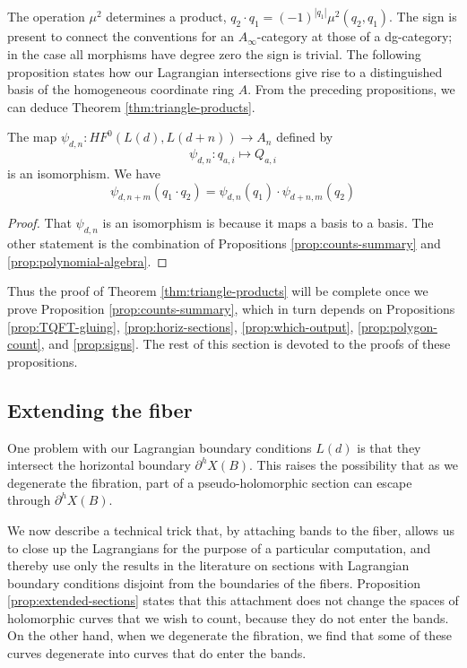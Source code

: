\documentclass[12pt]{amsart}
\begin{document}
The operation $\mu^2$ determines a product, $q_2 \cdot q_1 =
(-1)^{|q_1|} \mu^2(q_2,q_1)$. The sign is present to connect the
conventions for an $A_\infty$-category at those of a dg-category; in
the case all morphisms have degree zero the sign is trivial. The
following proposition states how our Lagrangian intersections give
rise to a distinguished basis of the homogeneous coordinate ring $A$. From the preceding propositions, we can deduce Theorem \ref{thm:triangle-products}.

\begin{proposition}
  \label{prop:coord-ring-iso}
  The map $\psi_{d,n}: HF^0(L(d),L(d+n)) \to A_n$ defined by
  \begin{equation}
    \psi_{d,n}: q_{a,i} \mapsto Q_{a,i}
  \end{equation}
  is an isomorphism. We have
  \begin{equation}
    \psi_{d,n+m} (q_1 \cdot q_2) = \psi_{d,n}(q_1) \cdot \psi_{d+n,m}(q_2)
  \end{equation}
\end{proposition}

\begin{proof}
  That $\psi_{d,n}$ is an isomorphism is because it maps a basis to a
  basis. The other statement is the combination of 
Propositions \ref{prop:counts-summary} and
  \ref{prop:polynomial-algebra}.
\end{proof}

Thus the proof of Theorem \ref{thm:triangle-products} will be complete once we prove Proposition \ref{prop:counts-summary}, which in turn depends on  Propositions \ref{prop:TQFT-gluing}, \ref{prop:horiz-sections},
  \ref{prop:which-output}, \ref{prop:polygon-count}, and \ref{prop:signs}. The rest of this section is devoted to the proofs of these propositions.

\subsection{Extending the fiber}
\label{sec:extend-fiber}

One problem with our Lagrangian boundary conditions $L(d)$ is that
they intersect the horizontal boundary $\partial^h X(B)$. This raises
the possibility that as we degenerate the fibration, part of a
pseudo-holomorphic section can escape through $\partial^h X(B)$.

We now describe a technical trick that, by attaching bands to the
fiber, allows us to close up the Lagrangians for the purpose of a
particular computation, and thereby use only the results in the
literature on sections with Lagrangian boundary conditions disjoint
from the boundaries of the fibers. Proposition \ref{prop:extended-sections} states that this attachment does not change the spaces of holomorphic curves that we wish to count, because they do not enter the bands. On the other hand, when we degenerate the fibration, we find that some of these curves degenerate into curves that do enter the bands. 
\end{document}
